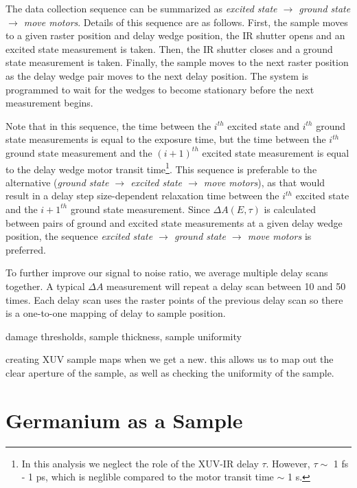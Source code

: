 The data collection sequence can be summarized as \textit{excited state $\rightarrow$ ground state $\rightarrow$ move motors}. Details of this sequence are as follows. First, the sample moves to a given raster position and delay wedge position, the IR shutter opens and an excited state measurement is taken. Then, the IR shutter closes and a ground state measurement is taken. Finally, the sample moves to the next raster position as the delay wedge pair moves to the next delay position. The system is programmed to wait for the wedges to become stationary before the next measurement begins.

Note that in this sequence, the time between the $i^{th}$ excited state and $i^{th}$ ground state measurements is equal to the exposure time, but the time between the $i^{th}$ ground state measurement and the $(i+1)^{th}$ excited state measurement is equal to the delay wedge motor transit time\footnote{In this analysis we neglect the role of the XUV-IR delay $\tau$. However, $\tau \sim$ 1 fs - 1 ps, which is neglible compared to the motor transit time $\sim$ 1 s.}. This sequence is preferable to the alternative (\textit{ground state $\rightarrow$ excited state $\rightarrow$ move motors}), as that would result in a delay step size-dependent relaxation time between the $i^{th}$ excited state and the $i+1^{th}$ ground state measurement. Since $\Delta A(E,\tau)$ is calculated between pairs of ground and excited state measurements at a given delay wedge position, the sequence \textit{excited state $\rightarrow$ ground state $\rightarrow$ move motors} is preferred.



To further improve our signal to noise ratio, we average multiple delay scans together. A typical $\Delta A$ measurement will repeat a delay scan between 10 and 50 times. Each delay scan uses the raster points of the previous delay scan so there is a one-to-one mapping of delay to sample position.



damage thresholds, sample thickness, sample uniformity

creating XUV sample maps when we get a new. this allows us to map out the clear aperture of the sample, as well as checking the uniformity of the sample.


\section{Germanium as a Sample}

